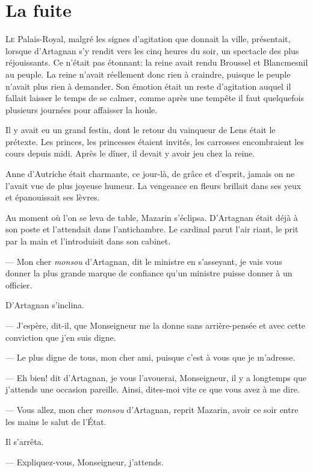 \chapter{La fuite}

\lettrine{L}{e} Palais-Royal, malgré les signes d'agitation que donnait la ville, présentait, lorsque d'Artagnan s'y rendit vers les cinq heures du soir, un spectacle des plus réjouissants. Ce n'était pas étonnant: la reine avait rendu Broussel et Blancmesnil au peuple. La reine n'avait réellement donc rien à craindre, puisque le peuple n'avait plus rien à demander. Son émotion était un reste d'agitation auquel il fallait laisser le temps de se calmer, comme après une tempête il faut quelquefois plusieurs journées pour affaisser la houle.

Il y avait eu un grand festin, dont le retour du vainqueur de Lens était le prétexte. Les princes, les princesses étaient invités, les carrosses encombraient les cours depuis midi. Après le dîner, il devait y avoir jeu chez la reine.

Anne d'Autriche était charmante, ce jour-là, de grâce et d'esprit, jamais on ne l'avait vue de plus joyeuse humeur. La vengeance en fleurs brillait dans ses yeux et épanouissait ses lèvres.

Au moment où l'on se leva de table, Mazarin s'éclipsa. D'Artagnan était déjà à son poste et l'attendait dans l'antichambre. Le cardinal parut l'air riant, le prit par la main et l'introduisit dans son cabinet.

— Mon cher \textit{monsou} d'Artagnan, dit le ministre en s'asseyant, je vais vous donner la plus grande marque de confiance qu'un ministre puisse donner à un officier.

D'Artagnan s'inclina.

— J'espère, dit-il, que Monseigneur me la donne sans arrière-pensée et avec cette conviction que j'en suis digne.

— Le plus digne de tous, mon cher ami, puisque c'est à vous que je m'adresse.

— Eh bien! dit d'Artagnan, je vous l'avouerai, Monseigneur, il y a longtemps que j'attends une occasion pareille. Ainsi, dites-moi vite ce que vous avez à me dire.

— Vous allez, mon cher \textit{monsou} d'Artagnan, reprit Mazarin, avoir ce soir entre les mains le salut de l'État.

Il s'arrêta.

— Expliquez-vous, Monseigneur, j'attends.

